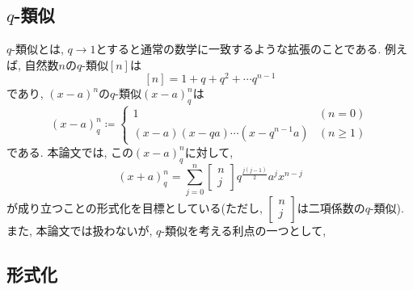 \documentclass[11pt]{jarticle}
\theoremstyle{mystyle}
\newcommand{\qcoe}[2]{\left[\begin{array}{ccc}#1\\#2\end{array}\right]}
\newcommand{\0}{\textbf{0}}
\newcommand{\1}{\textbf{1}}
\newcommand{\2}{\textbf{2}}
\begin{document}
\subsection{$q$-類似}
$q$-類似とは, $q \to 1$とすると通常の数学に一致するような拡張のことである. 例えば, 自然数$n$の$q$-類似$[n]$は
\[
  [n] = 1 + q + q^2 + \cdots q ^ {n -1} 
\]
であり, $(x-a)^n$の$q$-類似$(x-a)^n_q$は
\[
  (x-a)^n_q \coloneqq \begin{cases}
                                  1 & (n=0)\\
                                  (x-a)(x-qa)\cdots(x-q^{n-1}a) & (n\ge1)
                                \end{cases}
\]
である. 本論文では, この$(x - a)^n_q$に対して, 
\[
  (x+a)^n_q = \sum_{j=0}^n \qcoe{n}{j} q^{\frac{j(j-1)}{2}} a^j x^{n-j}
\]
が成り立つことの形式化を目標としている(ただし, $\qcoe{n}{j}$は二項係数の$q$-類似). また, 本論文では扱わないが, $q$-類似を考える利点の一つとして, 
\subsection{形式化}
\end{document}

